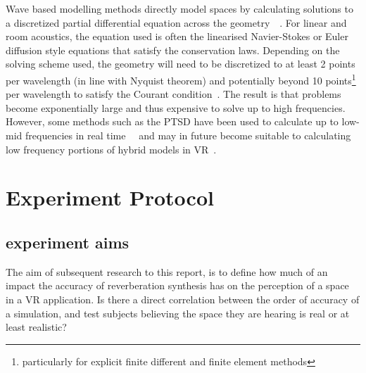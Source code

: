 \documentclass[paper=a4, fontsize=10pt, font=arial]{scrartcl} %
\numberwithin{equation}{section} %
\numberwithin{figure}{section} %
\numberwithin{table}{section} %
\begin{document}
Wave based modelling methods directly model spaces by calculating solutions to a discretized partial differential equation across the geometry~\cite{Botteldooren1995}~\cite{Bilbao2013}. For linear and room acoustics, the equation used is often the linearised Navier-Stokes or Euler diffusion style equations that satisfy the conservation laws. Depending on the solving scheme used, the geometry will need to be discretized to at least 2 points per wavelength (in line with Nyquist theorem) and potentially beyond 10 points\footnote{particularly for explicit finite different and finite element methods} per wavelength to satisfy the Courant condition~\cite{Siltanen2013}. The result is that problems become exponentially large and thus expensive to solve up to high frequencies. However, some methods such as the PTSD have been used to calculate up to low-mid frequencies in real time~\cite{Angus2010}~\cite{Savioja2010} and may in future become suitable to calculating low frequency portions of hybrid models in VR~\cite{Southern2012}.

\newpage
\section{Experiment Protocol}
\subsection{experiment aims}
The aim of subsequent research to this report, is to define how much of an impact the accuracy of reverberation synthesis has on the perception of a space in a VR application. Is there a direct correlation between the order of accuracy of a simulation, and test subjects believing the space they are hearing is real or at least realistic?
\end{document}
